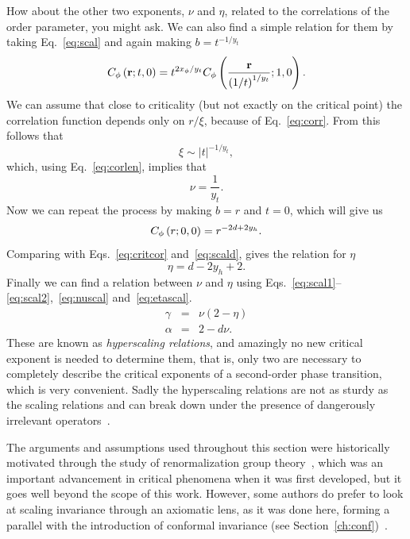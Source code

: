 How about the other two exponents, $\nu$ and $\eta$, related to the
correlations of the order parameter, you might ask. We can also find a simple
relation for them by taking Eq.~\ref{eq:scal} and again making $b=t^{-1/y_t}$
\begin{equation}
    C_{\phi}\left(\mathbf{r};t,0\right)=
    t^{2x_{\phi}/y_{t}}C_{\phi}
    \left(\frac{\mathbf{r}}{{\left(1/t\right)}^{1/y_{t}}};1,0\right).
\end{equation}
We can assume that close to criticality (but not exactly on the critical point)
the correlation function depends only on $r/\xi$, because of
Eq.~\ref{eq:corr}. From this follows that
\begin{equation}
    \xi\sim\left|t\right|^{-1/y_t},
\end{equation}
which, using Eq.~\ref{eq:corlen}, implies that
\begin{equation}
    \label{eq:nuscal}
    \nu=\frac{1}{y_t}.
\end{equation}
Now we can repeat the process by making $b=r$ and $t=0$, which will give us
\begin{equation}
    C_{\phi}\left(r;0,0\right)=r^{-2d+2y_{h}}.
\end{equation}
Comparing with Eqs.~\ref{eq:critcor} and~\ref{eq:scald}, gives the relation for
$\eta$
\begin{equation}
    \label{eq:etascal}
    \eta=d-2y_h+2.
\end{equation}
Finally we can find a relation between $\nu$ and $\eta$ using
Eqs.~\ref{eq:scal1}--\ref{eq:scal2},~\ref{eq:nuscal} and~\ref{eq:etascal}.
\begin{eqnarray}
    \label{eq:hs1}
    \gamma & = & \nu\left(2-\eta\right)\\
    \label{eq:hs2}
    \alpha & = & 2-d\nu.
\end{eqnarray}
These are known as \textit{hyperscaling relations}, and amazingly no new
critical exponent is needed to determine them, that is, only two are necessary
to completely describe the critical exponents of a second-order phase
transition, which is very convenient. Sadly the hyperscaling relations are not
as sturdy as the scaling relations and can break down under the presence of
dangerously irrelevant operators~\cite{Nishimori2011}.

The arguments and assumptions used throughout this section were historically
motivated through the study of renormalization group
theory~\cite{Pelissetto2002}, which was an important advancement in critical
phenomena when it was first developed, but it goes well beyond the scope of
this work. However, some authors do prefer to look at scaling invariance
through an axiomatic lens, as it was done here, forming a parallel with the
introduction of conformal invariance (see
Section~\ref{ch:conf})~\cite{Henkel2013}.


